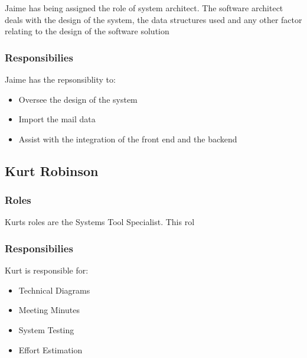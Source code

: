 	Jaime has being assigned the role of system architect. The software architect deals with the design of the system, the data structures used and any other factor relating to the design of the software solution


\subsubsection{Responsibilies}

	Jaime has the repsonsiblity to: 

	\begin{itemize}
		\item Oversee the design of the system
		\item Import the mail data
		\item Assist with the integration of the front end and the backend
	\end{itemize}

\subsection{Kurt Robinson}


\subsubsection{Roles}

	Kurts roles are the Systems Tool Specialist. This rol 


\subsubsection{Responsibilies}

	Kurt is responsible for:

	\begin{itemize}
		\item Technical Diagrams
		\item Meeting Minutes
		\item System Testing
		\item Effort Estimation
	\end{itemize}